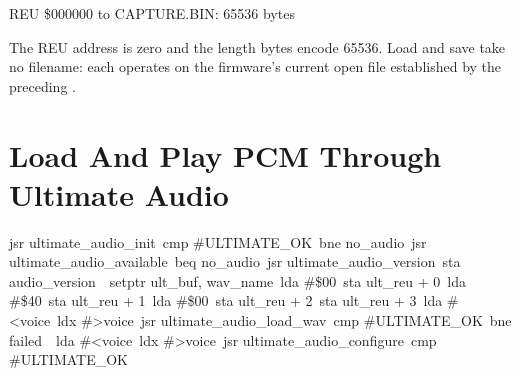 \begin{resultbox}
REU \$000000 to CAPTURE.BIN: 65536 bytes
\end{resultbox}

The REU address is zero and the length bytes encode 65536. Load and save take
no filename: each operates on the firmware's current open file established by
the preceding .


\section{Load And Play PCM Through Ultimate Audio}

\begin{listingbox}
\hspace*{2em}jsr ultimate\_audio\_init\
\hspace*{2em}cmp \#ULTIMATE\_OK\
\hspace*{2em}bne no\_audio\
\hspace*{2em}jsr ultimate\_audio\_available\
\hspace*{2em}beq no\_audio\
\hspace*{2em}jsr ultimate\_audio\_version\
\hspace*{2em}sta audio\_version\
\
\hspace*{2em}setptr ult\_buf, wav\_name\
\hspace*{2em}lda \#\$00\
\hspace*{2em}sta ult\_reu + 0\
\hspace*{2em}lda \#\$40\
\hspace*{2em}sta ult\_reu + 1\
\hspace*{2em}lda \#\$00\
\hspace*{2em}sta ult\_reu + 2\
\hspace*{2em}sta ult\_reu + 3\
\hspace*{2em}lda \#<voice\
\hspace*{2em}ldx \#>voice\
\hspace*{2em}jsr ultimate\_audio\_load\_wav\
\hspace*{2em}cmp \#ULTIMATE\_OK\
\hspace*{2em}bne failed\
\
\hspace*{2em}lda \#<voice\
\hspace*{2em}ldx \#>voice\
\hspace*{2em}jsr ultimate\_audio\_configure\
\hspace*{2em}cmp \#ULTIMATE\_OK\

\end{listingbox}
